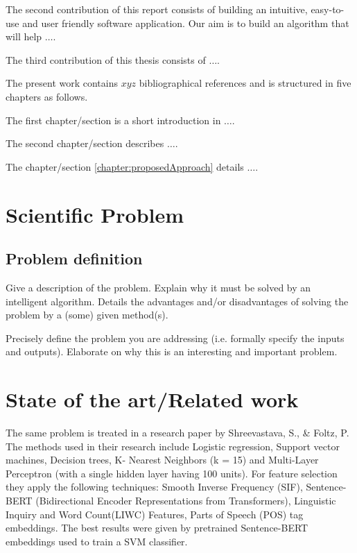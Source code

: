 \documentclass[runningheads,a4paper,11pt]{report}
\begin{document}
The second contribution of this report consists of building an intuitive, easy-to-use and user
friendly software application. Our aim is to build an algorithm that will help $\ldots$.

The third contribution of this thesis consists of $\ldots$.

The present work contains $xyz$ bibliographical references and is structured in five chapters as follows.

The first chapter/section is a short introduction in $\ldots$.

The second chapter/section describes $\ldots$.

The chapter/section \ref{chapter:proposedApproach} details $\ldots$.



\chapter{Scientific Problem}
\label{section:scientificProblem}


\section{Problem definition}
\label{section:problemDefinition}

Give a description of the problem.
Explain why it must be solved by an intelligent algorithm. 
Details the advantages and/or disadvantages of solving the problem by a (some) given method(s).

Precisely define the problem you are addressing (i.e. formally specify the inputs and outputs). Elaborate on why this is an interesting and important problem.




\chapter{State of the art/Related work}
\label{chapter:stateOfArt}

The same problem is treated in a research paper by Shreevastava, S., \& Foltz, P. The methods used in their research include Logistic regression, Support vector machines, Decision trees, K- Nearest Neighbors (k = 15) and Multi-Layer Perceptron (with a single hidden layer having 100 units). For feature selection they apply the following techniques: Smooth Inverse Frequency (SIF), Sentence-BERT (Bidirectional Encoder Representations from Transformers), Linguistic Inquiry and Word Count(LIWC) Features, Parts of Speech (POS) tag embeddings. The best results were given by pretrained Sentence-BERT embeddings used to train a SVM classifier.
\end{document}
